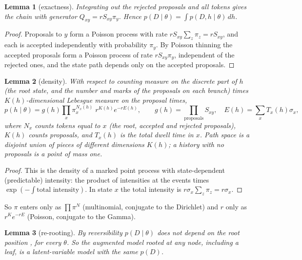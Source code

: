 \documentclass[11pt]{article}
\newtheorem{lemma}{Lemma}
\begin{document}
\begin{lemma}[exactness]\label{lem:exact}
Integrating out the rejected proposals and all tokens gives the chain with
generator $Q_{xy}=rS_{xy}\pi_y$. Hence $p(D\mid\theta)=\int p(D,h\mid\theta)\,dh$.
\end{lemma}
\begin{proof}
Proposals to $y$ form a Poisson process with rate $rS_{xy}\sum_z\pi_z=rS_{xy}$,
and each is accepted independently with probability $\pi_y$. By Poisson
thinning the accepted proposals form a Poisson process of rate $rS_{xy}\pi_y$,
independent of the rejected ones, and the state path depends only on the
accepted proposals.
\end{proof}

\begin{lemma}[density]\label{lem:density}
With respect to counting measure on the discrete part of $h$ (the root state,
and the number and marks of the proposals on each branch) times
$K(h)$-dimensional Lebesgue measure on the proposal times,
\begin{equation}\label{eq:density}
p(h\mid\theta)=g(h)\prod_x\pi_x^{N_x(h)}\;r^{K(h)}e^{-rE(h)},
\qquad g(h)=\prod_{\text{proposals}}S_{xy},\quad E(h)=\sum_xT_x(h)\sigma_x,
\end{equation}
where $N_x$ counts tokens equal to $x$ (the root, accepted and rejected
proposals), $K(h)$ counts proposals, and $T_x(h)$ is the total dwell time in
$x$. Path space is a disjoint union of pieces of different dimensions $K(h)$;
a history with no proposals is a point of mass one.
\end{lemma}
\begin{proof}
This is the density of a marked point process with state-dependent
(predictable) intensity: the product of intensities at the events times
$\exp(-\int\text{total intensity})$. In state $x$ the total intensity is
$r\sigma_x\sum_z\pi_z=r\sigma_x$.
\end{proof}

So $\pi$ enters only as $\prod\pi^{N}$ (multinomial, conjugate to the
Dirichlet) and $r$ only as $r^Ke^{-rE}$ (Poisson, conjugate to the Gamma).

\begin{lemma}[re-rooting]\label{lem:reroot}
By reversibility $p(D\mid\theta)$ does not depend on the root position
\citep{Felsenstein81}, for every $\theta$. So the augmented model rooted at any
node, including a leaf, is a latent-variable model with the same $p(D)$.
\end{lemma}
\end{document}
